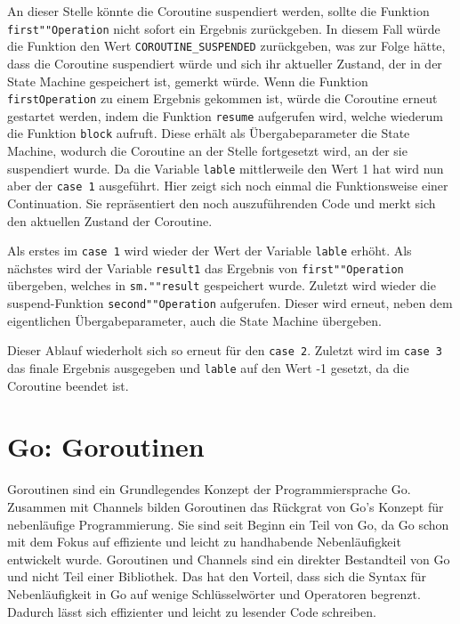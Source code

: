 \documentclass[fontsize=12pt,paper=a4,twoside=semi,parskip=half-,headsepline,headinclude]{scrreprt}
\begin{document}
An dieser Stelle könnte die Coroutine suspendiert werden, sollte die Funktion \texttt{first""Operation} nicht sofort ein Ergebnis zurückgeben. In diesem Fall würde die Funktion den Wert \texttt{COROUTINE\_SUSPENDED} zurückgeben\cite{Akhin2024}, was zur Folge hätte, dass die Coroutine suspendiert würde und sich ihr aktueller Zustand, der in der State Machine gespeichert ist, gemerkt würde. Wenn die Funktion \texttt{firstOperation} zu einem Ergebnis gekommen ist, würde die Coroutine erneut gestartet werden, indem die Funktion \texttt{resume} aufgerufen wird, welche wiederum die Funktion \texttt{block} aufruft. Diese erhält als Übergabeparameter die State Machine, wodurch die Coroutine an der Stelle fortgesetzt wird, an der sie suspendiert wurde. Da die Variable \texttt{lable} mittlerweile den Wert 1 hat wird nun aber der \texttt{case 1} ausgeführt. Hier zeigt sich noch einmal die Funktionsweise einer Continuation. Sie repräsentiert den noch auszuführenden Code und merkt sich den aktuellen Zustand der Coroutine. 

Als erstes im \texttt{case 1} wird wieder der Wert der Variable \texttt{lable} erhöht. Als nächstes wird der Variable \texttt{result1} das Ergebnis von \texttt{first""Operation} übergeben, welches in \texttt{sm.""result} gespeichert wurde. Zuletzt wird wieder die suspend-Funktion \texttt{second""Operation} aufgerufen. Dieser wird erneut, neben dem eigentlichen Übergabeparameter, auch die State Machine übergeben.

Dieser Ablauf wiederholt sich so erneut für den \texttt{case 2}. Zuletzt wird im \texttt{case 3} das finale Ergebnis ausgegeben und \texttt{lable} auf den Wert -1 gesetzt, da die Coroutine beendet ist.

\newpage

\section{Go: Goroutinen}

Goroutinen sind ein Grundlegendes Konzept der Programmiersprache Go. Zusammen mit Channels bilden Goroutinen das Rückgrat von Go's Konzept für nebenläufige Programmierung. Sie sind seit Beginn ein Teil von Go, da Go schon mit dem Fokus auf effiziente und leicht zu handhabende Nebenläufigkeit entwickelt wurde. Goroutinen und Channels sind ein direkter Bestandteil von Go und nicht Teil einer Bibliothek. Das hat den Vorteil, dass sich die Syntax für Nebenläufigkeit in Go auf wenige Schlüsselwörter und Operatoren begrenzt. Dadurch lässt sich effizienter und leicht zu lesender Code schreiben.
\end{document}
